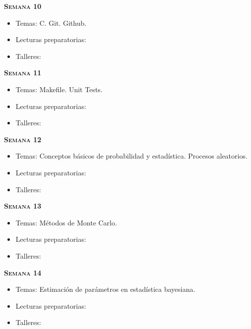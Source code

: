 \documentclass[letterpaper,10pt,onecolumn]{article}
\begin{document}
\noindent\textbf{\textsc{Semana 10}}\\[-0.5cm]
\begin{itemize}
\item Temas: C. Git. Github. \\[-0.6cm]
\item Lecturas preparatorias: \\[-0.6cm]
\item Talleres: \\[-0.6cm]
\end{itemize}

\noindent\textbf{\textsc{Semana 11}}\\[-0.5cm]
\begin{itemize}
\item Temas: Makefile. Unit Tests. \\[-0.6cm]
\item Lecturas preparatorias: \\[-0.6cm]
\item Talleres: \\[-0.6cm]
\end{itemize}


\noindent\textbf{\textsc{Semana 12}}\\[-0.5cm]
\begin{itemize}
\item Temas: Conceptos b\'asicos de
  probabilidad y estad\'istica. Procesos aleatorios. \\[-0.6cm]  
\item Lecturas preparatorias: \\[-0.6cm]
\item Talleres: \\[-0.6cm]
\end{itemize}

\noindent\textbf{\textsc{Semana 13}}\\[-0.5cm]
\begin{itemize}
\item Temas: M\'etodos de Monte Carlo.\\[-0.6cm]
\item Lecturas preparatorias: \\[-0.6cm]
\item Talleres: \\[-0.6cm]
\end{itemize}

\noindent\textbf{\textsc{Semana 14}}\\[-0.5cm]
\begin{itemize}
\item Temas: Estimaci\'on de par\'ametros en estad\'istica
  bayesiana.\\[-0.6cm] 
\item Lecturas preparatorias: \\[-0.6cm]
\item Talleres: \\[-0.6cm]
\end{itemize}
\end{document}
